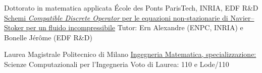 \documentclass[italian]{RMcv}
\begin{document}






%
%


%
        {Dottorato in matematica applicata}%
        {\'Ecole des Ponts ParisTech, INRIA, EDF R\&D}%
        {\href{https://tel.archives-ouvertes.fr/tel-03080530}{Schemi \emph{Compatible Discrete Operator} per le equazioni non-stazionarie di Navier--Stoker per un fluido incompressibile}}%
        {Tutor: Ern Alexandre (ENPC, INRIA) e Bonelle J\'er\^ome (EDF R\&D)}%

%
        {Laurea Magistrale}%
        {Politecnico di Milano}%
        {\href{https://www.politesi.polimi.it/handle/10589/133692}{Ingegneria Matematica, specializzazione:} Scienze Computazionali per l'Ingegneria}%
        {Voto di Laurea: 110 e Lode/110}
\end{document}
